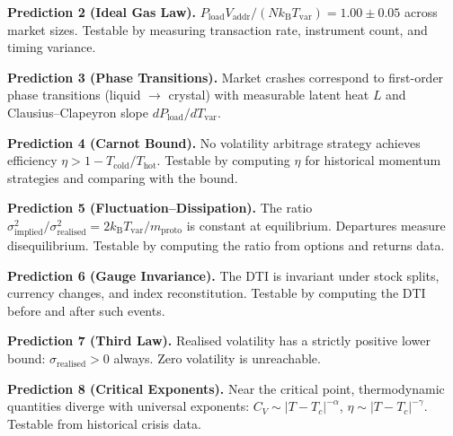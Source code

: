 \documentclass[twocolumn,10pt]{article}
\theoremstyle{remark}
\newcommand{\kB}{k_{\mathrm{B}}}
\newcommand{\Tvar}{T_{\mathrm{var}}}
\newcommand{\Pload}{P_{\mathrm{load}}}
\newcommand{\Vaddr}{V_{\mathrm{addr}}}
\newcommand{\mproto}{m_{\mathrm{proto}}}
\begin{document}
\textbf{Prediction 2 (Ideal Gas Law).}  $\Pload\Vaddr/(N\kB\Tvar) = 1.00 \pm 0.05$ across market sizes.  Testable by measuring transaction rate, instrument count, and timing variance.

\textbf{Prediction 3 (Phase Transitions).}  Market crashes correspond to first-order phase transitions (liquid $\to$ crystal) with measurable latent heat $L$ and Clausius--Clapeyron slope $d\Pload/d\Tvar$.

\textbf{Prediction 4 (Carnot Bound).}  No volatility arbitrage strategy achieves efficiency $\eta > 1 - T_{\mathrm{cold}}/T_{\mathrm{hot}}$.  Testable by computing $\eta$ for historical momentum strategies and comparing with the bound.

\textbf{Prediction 5 (Fluctuation--Dissipation).}  The ratio $\sigma^2_{\mathrm{implied}} / \sigma^2_{\mathrm{realised}} = 2\kB\Tvar/\mproto$ is constant at equilibrium.  Departures measure disequilibrium.  Testable by computing the ratio from options and returns data.

\textbf{Prediction 6 (Gauge Invariance).}  The DTI is invariant under stock splits, currency changes, and index reconstitution.  Testable by computing the DTI before and after such events.

\textbf{Prediction 7 (Third Law).}  Realised volatility has a strictly positive lower bound: $\sigma_{\mathrm{realised}} > 0$ always.  Zero volatility is unreachable.

\textbf{Prediction 8 (Critical Exponents).}  Near the critical point, thermodynamic quantities diverge with universal exponents: $C_V \sim |T - T_c|^{-\alpha}$, $\eta \sim |T - T_c|^{-\gamma}$.  Testable from historical crisis data.
\end{document}

